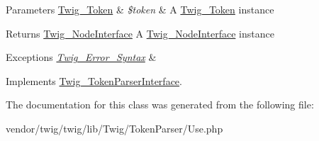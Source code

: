 \begin{DoxyParams}[1]{Parameters}
\hyperlink{classTwig__Token}{Twig\+\_\+\+Token} & {\em \$token} & A \hyperlink{classTwig__Token}{Twig\+\_\+\+Token} instance\\
\hline
\end{DoxyParams}
\begin{DoxyReturn}{Returns}
\hyperlink{interfaceTwig__NodeInterface}{Twig\+\_\+\+Node\+Interface} A \hyperlink{interfaceTwig__NodeInterface}{Twig\+\_\+\+Node\+Interface} instance
\end{DoxyReturn}

\begin{DoxyExceptions}{Exceptions}
{\em \hyperlink{classTwig__Error__Syntax}{Twig\+\_\+\+Error\+\_\+\+Syntax}} & \\
\hline
\end{DoxyExceptions}


Implements \hyperlink{interfaceTwig__TokenParserInterface_a9d003ebcca4a13c6f36b86e79815e823}{Twig\+\_\+\+Token\+Parser\+Interface}.



The documentation for this class was generated from the following file\+:\begin{DoxyCompactItemize}
\item 
vendor/twig/twig/lib/\+Twig/\+Token\+Parser/Use.\+php\end{DoxyCompactItemize}
